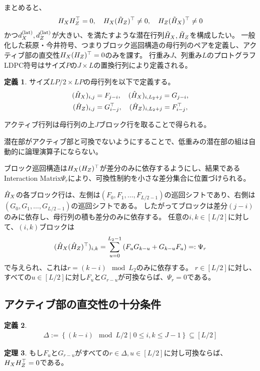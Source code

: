 \documentclass[a4paper,11pt,dvipdfmx]{jsarticle}
\theoremstyle{definition}
\newtheorem{definition}{定義}[section]
\newtheorem{theorem}[definition]{定理}
\begin{document}
まとめると、
\begin{align}
H_XH_Z^\top = 0,\quad H_X(\tilde{H}_Z)^\top \neq 0, \quad H_Z(\tilde{H}_X)^\top \neq 0 
\end{align}
かつ$d_X^{(\text{lat})},d_Z^{(\text{lat})}$が大きい、を満たすような潜在行列$\tilde{H}_X,\tilde{H}_Z$を構成したい。
一般化した萩原・今井符号、つまりブロック巡回構造の母行列のペアを定義し、アクティブ部の直交性$H_X(H_Z)^\top = 0$のみを課す。
行重み$J$、列重み$L$のプロトグラフLDPC符号はサイズ$P$の$J\times L$の置換行列により定義される。

\begin{definition}\label{def:01238}
  サイズ$LP/2\times LP$の母行列を以下で定義する。
  \begin{align}
    (\hat{H}_X)_{i,j} &= F_{j-i},\quad (\hat{H}_X)_{i,L_2+j}=G_{j-i},\\
    (\hat{H}_Z)_{i,j} &= G_{i-j}^\top,\quad (\hat{H}_Z)_{i,L_2+j}=F_{i-j}^\top,
  \end{align}
\end{definition}
アクティブ行列は母行列の上$J$ブロック行を取ることで得られる。

潜在部がアクティブ部と可換でないようにすることで、低重みの潜在部の組は自動的に論理演算子にならない。

ブロック巡回構造は$H_X(H_Z)^\top$が差分のみに依存するようにし、結果である
Interaction Matrix$\Psi_r$により、可換性制約を小さな差分集合に位置づけられる。


$\hat{H}_X$の各ブロック行は、左側は$(F_0,F_1,\dots,F_{L/2-1})$の巡回シフトであり、右側は$(G_0,G_1,\dots,G_{L/2-1})$の巡回シフトである。
したがってブロックは差分$(j-i)$のみに依存し、母行列の積も差分のみに依存する。
任意の$i,k\in[L/2]$に対して、$(i,k)$ブロックは
\begin{align}
  (\hat{H}_X(\hat{H}_Z)^\top)_{i,k} = \sum_{u=0}^{L_2-1}\left(F_uG_{k-u} + G_{k-u}F_u\right) =: \Psi_r
\end{align}
で与えられ、これは$r=(k-i)\mod L_2$のみに依存する。
$r\in[L/2]$に対し、すべての$u\in[L/2]$に対し$F_u$と$G_{r-u}$が可換ならば、$\Psi_r=0$である。

\subsection{アクティブ部の直交性の十分条件}
\begin{definition}\label{def:01239}
  \begin{align}
    \Delta := \left\{(k-i)\mod L/2\mid 0\leq i,k\leq J-1\right\}\subseteq[L/2]
  \end{align}
\end{definition}
\begin{theorem}\label{th:012310}
  もし$F_u$と$G_{r-u}$がすべての$r\in\Delta,u\in[L/2]$に対し可換ならば、$H_XH_Z^\top=0$である。
\end{theorem}
\end{document}
